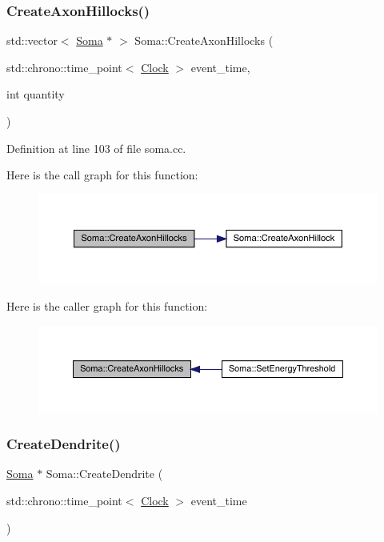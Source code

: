 \subsubsection{\texorpdfstring{Create\+Axon\+Hillocks()}{CreateAxonHillocks()}}
{\footnotesize\ttfamily std\+::vector$<$ \hyperlink{class_soma}{Soma} $\ast$ $>$ Soma\+::\+Create\+Axon\+Hillocks (\begin{DoxyParamCaption}\item[{std\+::chrono\+::time\+\_\+point$<$ \hyperlink{universe_8h_a0ef8d951d1ca5ab3cfaf7ab4c7a6fd80}{Clock} $>$}]{event\+\_\+time,  }\item[{int}]{quantity }\end{DoxyParamCaption})}



Definition at line 103 of file soma.\+cc.

Here is the call graph for this function\+:
\nopagebreak
\begin{figure}[H]
\begin{center}
\leavevmode
\includegraphics[width=350pt]{class_soma_ab059a6d4a7dc41664d6d17794d09b260_cgraph}
\end{center}
\end{figure}
Here is the caller graph for this function\+:
\nopagebreak
\begin{figure}[H]
\begin{center}
\leavevmode
\includegraphics[width=350pt]{class_soma_ab059a6d4a7dc41664d6d17794d09b260_icgraph}
\end{center}
\end{figure}
\mbox{\label{class_soma_a0fab0c7cf54c2b7d36e90edcd3e21a16}} 
\subsubsection{\texorpdfstring{Create\+Dendrite()}{CreateDendrite()}}
{\footnotesize\ttfamily \hyperlink{class_soma}{Soma} $\ast$ Soma\+::\+Create\+Dendrite (\begin{DoxyParamCaption}\item[{std\+::chrono\+::time\+\_\+point$<$ \hyperlink{universe_8h_a0ef8d951d1ca5ab3cfaf7ab4c7a6fd80}{Clock} $>$}]{event\+\_\+time }\end{DoxyParamCaption})}



